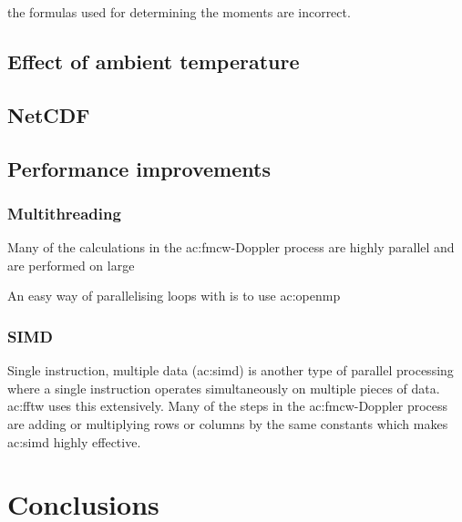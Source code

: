 \documentclass{article}
\begin{document}
the formulas used for determining the moments are incorrect.

\subsection{Effect of ambient temperature}
\subsection{NetCDF}

\subsection{Performance improvements}
\subsubsection{Multithreading}
Many of the calculations in the \acrshort{ac:fmcw}-Doppler process are highly parallel and are performed on large 

An easy way of parallelising loops with is to use \acrshort{ac:openmp}

\subsubsection{SIMD}
Single instruction, multiple data (\acrshort{ac:simd}) is another type of parallel processing where a single instruction operates simultaneously on multiple pieces of data. \acrshort{ac:fftw} uses this extensively. Many of the steps in the \acrshort{ac:fmcw}-Doppler process are adding or multiplying rows or columns by the same constants which makes \acrshort{ac:simd} highly effective.

\section{Conclusions}

\clearpage
\printbibliography
\end{document}
